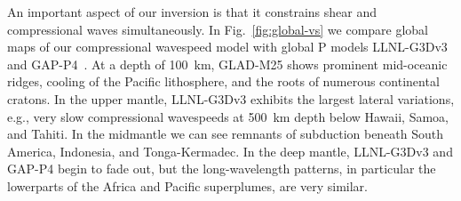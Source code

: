 \documentclass[extra,mreferee]{gji}
\begin{document}

An important aspect of our inversion is that it constrains shear and
compressional waves simultaneously. In Fig.~\ref{fig:global-vs} we
compare global maps of our compressional wavespeed model with global P models
LLNL-G3Dv3~\citep{simmons2012llnl} and GAP-P4~\citep{fukao2013subducted}.
At a depth of 100~km,
GLAD-M25 shows prominent mid-oceanic ridges, cooling of the Pacific lithosphere,
and the roots of numerous continental cratons. In the upper mantle, LLNL-G3Dv3
exhibits the largest lateral variations,
e.g., very slow compressional wavespeeds at 500~km depth below Hawaii, Samoa, and Tahiti.
In the midmantle we can see remnants of subduction beneath South America, Indonesia,
and Tonga-Kermadec.
In the deep mantle, LLNL-G3Dv3 and GAP-P4 begin to fade out, but the long-wavelength patterns,
in particular the lowerparts of the Africa and Pacific superplumes, are very similar.
\end{document}
